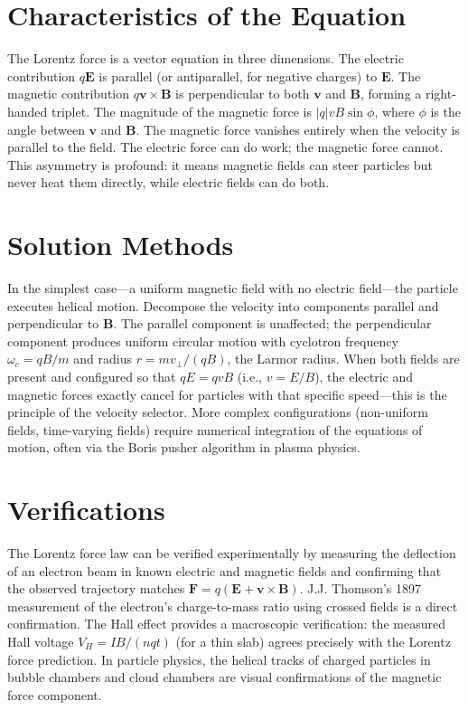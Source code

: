 \section*{Characteristics of the Equation}

The Lorentz force is a vector equation in three dimensions. The electric contribution $q\mathbf{E}$ is parallel (or antiparallel, for negative charges) to $\mathbf{E}$. The magnetic contribution $q\mathbf{v}\times\mathbf{B}$ is perpendicular to both $\mathbf{v}$ and $\mathbf{B}$, forming a right-handed triplet. The magnitude of the magnetic force is $|q|vB\sin\phi$, where $\phi$ is the angle between $\mathbf{v}$ and $\mathbf{B}$. The magnetic force vanishes entirely when the velocity is parallel to the field. The electric force can do work; the magnetic force cannot. This asymmetry is profound: it means magnetic fields can steer particles but never heat them directly, while electric fields can do both.
\section*{Solution Methods}

In the simplest case---a uniform magnetic field with no electric field---the particle executes helical motion. Decompose the velocity into components parallel and perpendicular to $\mathbf{B}$. The parallel component is unaffected; the perpendicular component produces uniform circular motion with cyclotron frequency $\omega_c = qB/m$ and radius $r = mv_\perp / (qB)$, the Larmor radius. When both fields are present and configured so that $qE = qvB$ (i.e., $v = E/B$), the electric and magnetic forces exactly cancel for particles with that specific speed---this is the principle of the velocity selector. More complex configurations (non-uniform fields, time-varying fields) require numerical integration of the equations of motion, often via the Boris pusher algorithm in plasma physics.
\section*{Verifications}

The Lorentz force law can be verified experimentally by measuring the deflection of an electron beam in known electric and magnetic fields and confirming that the observed trajectory matches $\mathbf{F} = q(\mathbf{E} + \mathbf{v}\times\mathbf{B})$. J.J. Thomson's 1897 measurement of the electron's charge-to-mass ratio using crossed fields is a direct confirmation. The Hall effect provides a macroscopic verification: the measured Hall voltage $V_H = IB/(nqt)$ (for a thin slab) agrees precisely with the Lorentz force prediction. In particle physics, the helical tracks of charged particles in bubble chambers and cloud chambers are visual confirmations of the magnetic force component.

